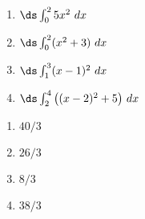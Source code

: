 {\noindent
\begin{minipage}{\linewidth}
\end{minipage}
\begin{enumerate}
\item		$\ds \int_{0}^{2} 5x^2\ dx$
\item		$\ds \int_0^2 (x^2+3)\ dx$
\item		$\ds \int_{1}^3 (x-1)^2\ dx$
\item		$\ds \int_2^4 \big((x-2)^2+5\big)\ dx$
\end{enumerate}

}
{\begin{enumerate}
\item		$40/3$
\item		$26/3$
\item		$8/3$
\item		$38/3$
\end{enumerate}
}

